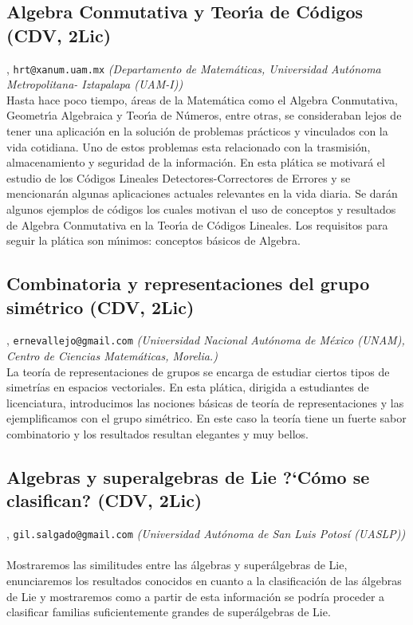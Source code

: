 \subsection{\sffamily Algebra Conmutativa y Teor\'\i a de C\'odigos {\footnotesize (CDV, 2Lic)}} \label{reg-375} 
, {\tt hrt@xanum.uam.mx}  {\slshape (Departamento de Matem\'aticas,  Universidad Aut\'onoma Metropolitana- Iztapalapa (UAM-I))}\\
          \noindent Hasta hace poco tiempo, \'areas de la Matem\'atica como el Algebra Conmutativa, Geometr\'\i a Algebraica y Teor\'\i a de N\'umeros, entre otras, se consideraban lejos de tener una aplicaci\'on en la soluci\'on de problemas pr\'acticos y vinculados con la vida cotidiana. Uno de estos problemas esta relacionado con la trasmisi\'on, almacenamiento y seguridad de la informaci\'on. En esta pl\'atica se motivar\'a el estudio de los C\'odigos Lineales Detectores-Correctores de Errores y se mencionar\'an algunas aplicaciones actuales relevantes en la vida diaria.  Se dar\'an algunos ejemplos de c\'odigos los cuales motivan el uso de conceptos y resultados de Algebra Conmutativa en la Teor\'\i a de C\'odigos Lineales. Los requisitos para seguir la pl\'atica son m\'\i nimos: conceptos b\'asicos de Algebra.
\subsection{\sffamily Combinatoria y representaciones del grupo sim\'etrico {\footnotesize (CDV, 2Lic)}} \label{reg-410} 
, {\tt ernevallejo@gmail.com}  {\slshape (Universidad Nacional Aut\'onoma de M\'exico (UNAM), Centro de Ciencias Matem\'aticas, Morelia.)}\\
          \noindent La teor\'ia de representaciones de grupos se encarga de estudiar ciertos tipos de simetr\'ias en espacios vectoriales. En esta pl\'atica, dirigida a estudiantes de licenciatura, introducimos las nociones b\'asicas de teor\'ia de representaciones y las ejemplificamos con el grupo sim\'etrico. En este caso la teor\'ia tiene un fuerte sabor combinatorio y los resultados resultan elegantes y muy bellos.
\subsection{\sffamily Algebras y superalgebras de Lie ?`C\'omo se clasifican? {\footnotesize (CDV, 2Lic)}} \label{reg-1243} 
, {\tt gil.salgado@gmail.com}  {\slshape (Universidad Aut\'onoma de San Luis Potos\'i (UASLP))}\\
\\
\noindent Mostraremos las similitudes entre las \'algebras y super\'algebras de Lie, enunciaremos los resultados conocidos en cuanto a la clasificaci\'on de las \'algebras de Lie y mostraremos como a partir de esta informaci\'on se podr\'ia proceder a clasificar familias suficientemente grandes de super\'algebras de Lie.
